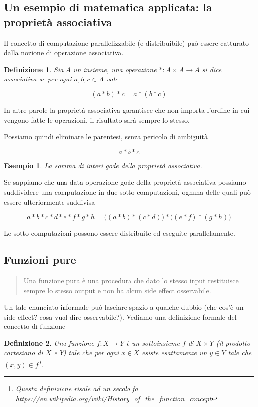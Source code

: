 \documentclass[12pt]{article}
\newtheorem{definition}{Definizione}[section]
\newtheorem{example}{Esempio}[section]
\begin{document}
\subsection{Un esempio di matematica applicata: la proprietà associativa}

Il concetto di computazione parallelizzabile (e distribuibile) può essere catturato dalla nozione di operazione associativa.

\begin{definition}
Sia $A$ un insieme, una operazione $*: A \times A \rightarrow A$ si dice \emph{associativa} se per ogni $a, b, c \in A$ vale

$$
(a * b) * c = a * ( b * c )
$$
\end{definition}

In altre parole la proprietà associativa garantisce che non importa l'ordine in cui vengono fatte le operazioni, il risultato sarà sempre lo stesso.

Possiamo quindi eliminare le parentesi, senza pericolo di ambiguità

$$
a * b * c
$$

\begin{example}
La somma di interi gode della proprietà associativa.
\end{example}

Se sappiamo che una data operazione gode della proprietà associativa possiamo suddividere una computazione in due sotto computazioni, ognuna delle quali può essere ulteriormente suddivisa

$$
a * b * c * d * e * f * g * h = \Big( ( a * b ) * ( c * d ) \Big) * \Big( ( e * f ) * ( g * h ) \Big)
$$

Le sotto computazioni possono essere distribuite ed eseguite parallelamente.

\subsection{Funzioni pure}

\begin{quote}
Una funzione pura è una procedura che dato lo stesso input restituisce sempre lo stesso output e non ha alcun side effect osservabile.
\end{quote}

Un tale enunciato informale può lasciare spazio a qualche dubbio (che cos'è un side effect? cosa vuol dire osservabile?).
Vediamo una definizione formale del concetto di funzione

\begin{definition}
Una \emph{funzione} $f: X \rightarrow Y$ è un sottoinsieme $f$ di $X \times Y$ (il \emph{prodotto cartesiano} di $X$ e $Y$) tale che
per ogni $x \in X$ esiste esattamente un $y \in Y$ tale che $(x, y) \in f$\footnote{Questa definizione risale ad un secolo fa https://en.wikipedia.org/wiki/History\_of\_the\_function\_concept}.
\end{definition}
\end{document}
